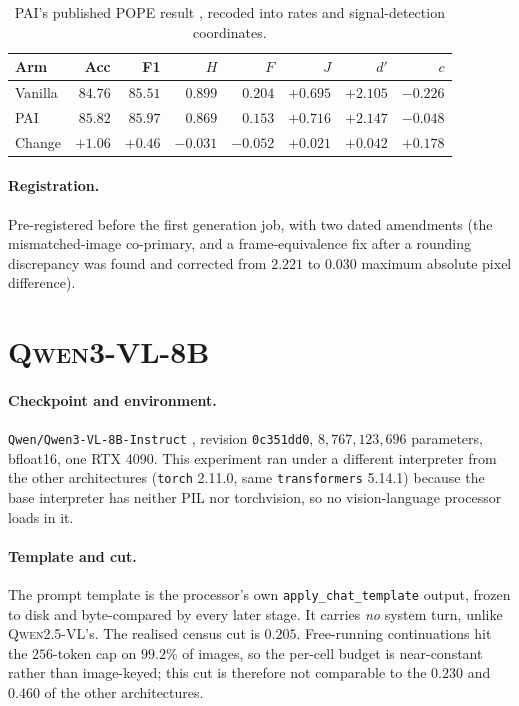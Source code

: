 \begin{table}[h]
\caption{PAI's published POPE result \citep[Table~2]{pai}, recoded into rates and signal-detection
coordinates.}
\label{tab:paipub}
\begin{center}
\small
\begin{tabular}{lrrrrrrr}
\toprule
Arm & Acc & F1 & $H$ & $F$ & $J$ & $d'$ & $c$ \\
\midrule
Vanilla & $84.76$ & $85.51$ & $0.899$ & $0.204$ & $+0.695$ & $+2.105$ & $-0.226$ \\
PAI     & $85.82$ & $85.97$ & $0.869$ & $0.153$ & $+0.716$ & $+2.147$ & $-0.048$ \\
\midrule
Change  & $+1.06$ & $+0.46$ & $-0.031$ & $-0.052$ & $+0.021$ & $+0.042$ & $+0.178$ \\
\bottomrule
\end{tabular}
\end{center}
\end{table}

\paragraph{Registration.} Pre-registered before the first generation job, with two dated amendments
(the mismatched-image co-primary, and a frame-equivalence fix after a rounding discrepancy was found
and corrected from $2.221$ to $0.030$ maximum absolute pixel difference).


\section{\textsc{Qwen3-VL-8B}}
\label{app:qwen3}

\paragraph{Checkpoint and environment.} \texttt{Qwen/Qwen3-VL-8B-Instruct} \citep{qwen3vl}, revision
\texttt{0c351dd0}, $8{,}767{,}123{,}696$ parameters, bfloat16, one RTX 4090. This experiment ran under a
different interpreter from the other architectures (\texttt{torch} 2.11.0, same
\texttt{transformers} 5.14.1) because the base interpreter has neither PIL nor torchvision, so no
vision-language processor loads in it.

\paragraph{Template and cut.} The prompt template is the processor's own
\texttt{apply\_chat\_template} output, frozen to disk and byte-compared by every later stage. It
carries \emph{no} system turn, unlike \textsc{Qwen2.5-VL}'s. The realised census cut is $0.205$.
Free-running continuations hit the $256$-token cap on $99.2\%$ of images, so the per-cell budget is
near-constant rather than image-keyed; this cut is therefore not comparable to the $0.230$ and
$0.460$ of the other architectures.

